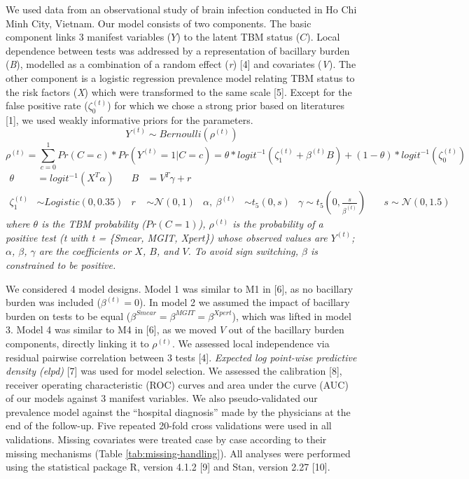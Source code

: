 \documentclass[
  12pt,
]{article}
\begin{document}
We used data from an observational study of brain infection conducted in Ho Chi Minh City, Vietnam. Our model consists of two components. The basic component links 3 manifest variables (\(Y\)) to the latent TBM status (\(C\)). Local dependence between tests was addressed by a representation of bacillary burden (\emph{B}), modelled as a combination of a random effect (\emph{r}) {[}4{]} and covariates (\emph{V}). The other component is a logistic regression prevalence model relating TBM status to the risk factors (\emph{X}) which were transformed to the same scale {[}5{]}. Except for the false positive rate (\(\zeta^{(t)}_0\)) for which we chose a strong prior based on literatures {[}1{]}, we used weakly informative priors for the parameters.
\[
Y^{(t)} \sim Bernoulli(\rho^{(t)})
\]
\[
\rho^{(t)} 
=\sum_{c=0}^1Pr(C=c) * Pr(Y^{(t)}=1|C=c)
= \theta * logit^{-1}(\zeta_1^{(t)} + \beta^{(t)}B) + (1 - \theta) * logit^{-1}(\zeta_0^{(t)})
\]
\[
\begin{aligned}
\theta &= logit^{-1}(X^T \alpha) &B &= V^T \gamma + r \\
\zeta^{(t)}_1 &\sim Logistic(0,0.35) 
&r &\sim \mathcal{N}(0, 1) 
&{\alpha,\ \beta^{(t)}} &\sim t_5(0, s) &\gamma \sim t_5(0, \frac{s}{\overline{\beta^{(t)}}})
&\ &s \sim \mathcal{N}(0, 1.5)
\end{aligned}
\]
\emph{where \(\theta\) is the TBM probability (\(Pr(C=1)\)), \(\rho^{(t)}\) is the probability of a positive test (t with t = \{Smear, MGIT, Xpert\}) whose observed values are \(Y^{(t)}\); \(\alpha\), \(\beta\), \(\gamma\) are the coefficients or \(X\), \(B\), and \(V\). To avoid sign switching, \(\beta\) is constrained to be positive.}

We considered 4 model designs. Model 1 was similar to M1 in {[}6{]}, as no bacillary burden was included (\(\beta^{(t)} = 0\)). In model 2 we assumed the impact of bacillary burden on tests to be equal (\(\beta^{Smear} = \beta^{MGIT} = \beta^{Xpert}\)), which was lifted in model 3. Model 4 was similar to M4 in {[}6{]}, as we moved \(V\) out of the bacillary burden components, directly linking it to \(\rho^{(t)}\). We assessed local independence via residual pairwise correlation between 3 tests {[}4{]}. \emph{Expected log point-wise predictive density (elpd)} {[}7{]} was used for model selection. We assessed the calibration {[}8{]}, receiver operating characteristic (ROC) curves and area under the curve (AUC) of our models against 3 manifest variables. We also pseudo-validated our prevalence model against the ``hospital diagnosis'' made by the physicians at the end of the follow-up. Five repeated 20-fold cross validations were used in all validations. Missing covariates were treated case by case according to their missing mechanisms (Table \ref{tab:missing-handling}). All analyses were performed using the statistical package \textsf{R}, version 4.1.2 {[}9{]} and \textsf{Stan}, version 2.27 {[}10{]}.
\end{document}
